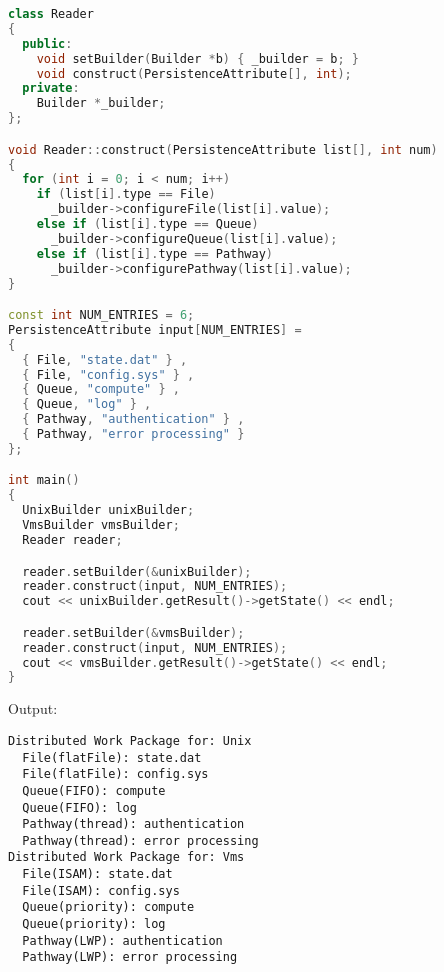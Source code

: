 \documentclass{book}
\begin{document}
\begin{lstlisting}[caption={Builder Patterns sample code 1}, language=C++]
class Reader
{
  public:
    void setBuilder(Builder *b) { _builder = b; }
    void construct(PersistenceAttribute[], int);
  private:
    Builder *_builder;
};

void Reader::construct(PersistenceAttribute list[], int num)
{
  for (int i = 0; i < num; i++)
    if (list[i].type == File)
      _builder->configureFile(list[i].value);
    else if (list[i].type == Queue)
      _builder->configureQueue(list[i].value);
    else if (list[i].type == Pathway)
      _builder->configurePathway(list[i].value);
}

const int NUM_ENTRIES = 6;
PersistenceAttribute input[NUM_ENTRIES] = 
{
  { File, "state.dat" } , 
  { File, "config.sys" } , 
  { Queue, "compute" } , 
  { Queue, "log" } , 
  { Pathway, "authentication" } , 
  { Pathway, "error processing" }
};

int main()
{
  UnixBuilder unixBuilder;
  VmsBuilder vmsBuilder;
  Reader reader;

  reader.setBuilder(&unixBuilder);
  reader.construct(input, NUM_ENTRIES);
  cout << unixBuilder.getResult()->getState() << endl;

  reader.setBuilder(&vmsBuilder);
  reader.construct(input, NUM_ENTRIES);
  cout << vmsBuilder.getResult()->getState() << endl;
}
\end{lstlisting}
Output:
\begin{verbatim}
Distributed Work Package for: Unix
  File(flatFile): state.dat
  File(flatFile): config.sys
  Queue(FIFO): compute
  Queue(FIFO): log
  Pathway(thread): authentication
  Pathway(thread): error processing
Distributed Work Package for: Vms
  File(ISAM): state.dat
  File(ISAM): config.sys
  Queue(priority): compute
  Queue(priority): log
  Pathway(LWP): authentication
  Pathway(LWP): error processing
\end{verbatim}
\end{document}
